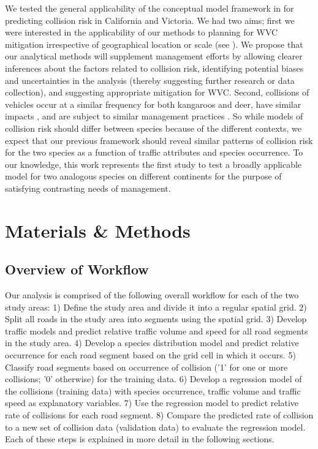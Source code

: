 We tested the general applicability of the conceptual model framework in  for predicting collision risk in California and Victoria.  We had two aims; first we were interested in the applicability of our methods to planning for WVC mitigation irrespective of geographical location or scale (see \cite{rvdr11}).  We propose that our analytical methods will supplement management efforts by allowing clearer inferences about the factors related to collision risk, identifying potential biases and uncertainties in the analysis (thereby suggesting further research or data collection), and suggesting appropriate mitigation for WVC.  Second, collisions of vehicles occur at a similar frequency for both kangaroos and deer, have similar impacts \citep{lang08}, and are subject to similar management practices \citep{mcsh97,crof04}.  So while models of collision risk should differ between species because of the different contexts, we expect that our previous framework should reveal similar patterns of collision risk for the two species as a function of traffic attributes and species occurrence.  To our knowledge, this work represents the first study to test a broadly applicable model for two analogous species on different continents for the purpose of satisfying contrasting needs of management.

\section{Materials \& Methods}

\subsection{Overview of Workflow}

Our analysis is comprised of the following overall workflow for each of the two study areas:
1)  Define the study area and divide it into a regular spatial grid.
2)  Split all roads in the study area into segments using the spatial grid.
3)  Develop traffic models and predict relative traffic volume and speed for all road segments in the study area.
4)  Develop a species distribution model and predict relative occurrence for each road segment based on the grid cell in which it occurs.
5)  Classify road segments based on occurrence of collision ('1' for one or more collisions; '0' otherwise) for the training data.
6)  Develop a regression model of the collisions (training data) with species occurrence, traffic volume and traffic speed as explanatory variables.
7)  Use the regression model to predict relative rate of collisions for each road segment.
8)  Compare the predicted rate of collision to a new set of collision data (validation data) to evaluate the regression model.
Each of these steps is explained in more detail in the following sections.

